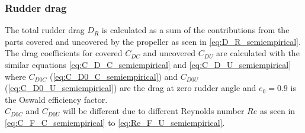 %
\begin{equation}
    \label{eq:f_semiempirical}
    
\end{equation}
%
\begin{equation}
    \label{eq:d_semiempirical}
    
\end{equation}
\begin{equation}
    \label{eq:c_semiempirical}
    
\end{equation}

\subsubsection{Rudder drag}
\label{sec:rudder_drag}
The total rudder drag $D_R$ is calculated as a sum of the contributions from the parts covered and uncovered by the propeller as seen in \autoref{eq:D_R_semiempirical}.
\begin{equation}
    \label{eq:D_R_semiempirical}
    
\end{equation}
The drag coefficients for covered $C_{DC}$ and uncovered $C_{DU}$ are calculated with the similar equations \autoref{eq:C_D_C_semiempirical} and \autoref{eq:C_D_U_semiempirical} where $C_{D0C}$ (\autoref{eq:C_D0_C_semiempirical}) and $C_{D0U}$ (\autoref{eq:C_D0_U_semiempirical}) are the drag at zero rudder angle  and $e_0 = 0.9$ is the Oswald efficiency factor. 
\begin{equation}
    \label{eq:C_D_C_semiempirical}
    
\end{equation}
%
\begin{equation}
    \label{eq:C_D_U_semiempirical}
    
\end{equation}
%
\begin{equation}
    \label{eq:C_D0_C_semiempirical}
    
\end{equation}
%
\begin{equation}
    \label{eq:C_D0_U_semiempirical}
    
\end{equation}
$C_{D0C}$ and $C_{D0U}$ will be different due to different Reynolds number $Re$ as seen in \autoref{eq:C_F_C_semiempirical} to \autoref{eq:Re_F_U_semiempirical}.

